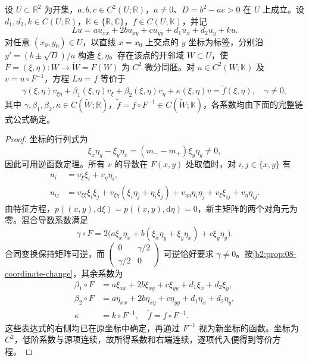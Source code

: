 \begin{proposition}\label{b2:prop:08-hyperbolic-coordinates}
设 \(U\subset\mathbb R^2\) 为开集，\(a,b,c\in C^2(U;\mathbb R)\)，\(a\ne0\)、\(D=b^2-ac>0\) 在 \(U\) 上成立。设 \(d_1,d_2,k\in C(U;\mathbb R)\)，\(\mathbb K\in\{\mathbb R,\mathbb C\}\)，\(f\in C(U;\mathbb K)\)，并记
\[
 Lu=au_{xx}+2bu_{xy}+cu_{yy}+d_1u_x+d_2u_y+ku.
\]
对任意 \((x_0,y_0)\in U\)，以直线 \(x=x_0\) 上交点的 \(y\) 坐标为标签，分别沿 \(y'=(b\pm\sqrt D)/a\) 构造 \(\xi,\eta\)。存在该点的开邻域 \(W\subset U\)，使 \(F=(\xi,\eta):W\to\widetilde W=F(W)\) 为 \(C^2\) 微分同胚。对 \(u\in C^2(W;\mathbb K)\) 及 \(v=u\circ F^{-1}\)，方程 \(Lu=f\) 等价于
\[
 \gamma(\xi,\eta)v_{\xi\eta}
 +\beta_1(\xi,\eta)v_\xi+\beta_2(\xi,\eta)v_\eta
 +\kappa(\xi,\eta)v=\widetilde f(\xi,\eta),
 \quad \gamma\ne0,
\]
其中 \(\gamma,\beta_1,\beta_2,\kappa\in C(\widetilde W;\mathbb R)\)，\(\widetilde f=f\circ F^{-1}\in C(\widetilde W;\mathbb K)\)，各系数均由下面的完整链式公式确定。
\end{proposition}
\begin{proof}
坐标的行列式为
\[
 \xi_x\eta_y-\xi_y\eta_x
 =(m_--m_+)\xi_y\eta_y\ne0,
\]
因此可用逆函数定理。所有 \(v\) 的导数在 \(F(x,y)\) 处取值时，对 \(i,j\in\{x,y\}\) 有
\[
 \begin{aligned}
 u_i&=v_\xi\xi_i+v_\eta\eta_i,\\
 u_{ij}&=v_{\xi\xi}\xi_i\xi_j
       +v_{\xi\eta}(\xi_i\eta_j+\eta_i\xi_j)
       +v_{\eta\eta}\eta_i\eta_j
       +v_\xi\xi_{ij}+v_\eta\eta_{ij}.
 \end{aligned}
\]
由特征方程，\(p((x,y),\mathrm d\xi)=p((x,y),\mathrm d\eta)=0\)，新主矩阵的两个对角元为零。混合导数系数满足
\[
 \gamma\circ F
 =2\bigl(a\xi_x\eta_x+b(\xi_x\eta_y+\xi_y\eta_x)+c\xi_y\eta_y\bigr).
\]
合同变换保持矩阵可逆，而 \(\left(\begin{smallmatrix}0&\gamma/2\\\gamma/2&0\end{smallmatrix}\right)\) 可逆恰好要求 \(\gamma\ne0\)。按\cref{b2:prop:08-coordinate-change}，其余系数为
\[
 \begin{aligned}
 \beta_1\circ F&=a\xi_{xx}+2b\xi_{xy}+c\xi_{yy}
                    +d_1\xi_x+d_2\xi_y,\\
 \beta_2\circ F&=a\eta_{xx}+2b\eta_{xy}+c\eta_{yy}
                    +d_1\eta_x+d_2\eta_y,\\
 \kappa&=k\circ F^{-1},\quad \widetilde f=f\circ F^{-1}.
 \end{aligned}
\]
这些表达式的右侧均已在原坐标中确定，再通过 \(F^{-1}\) 视为新坐标的函数。坐标为 \(C^2\)，低阶系数与源项连续，故所得系数和右端连续，逐项代入便得到等价方程。
\end{proof}

